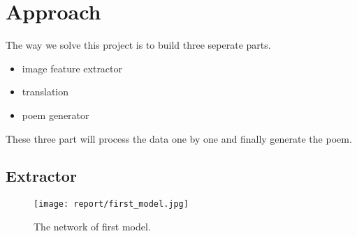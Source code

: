 \documentclass[10pt,twocolumn,letterpaper]{article}
\begin{document}

\section{Approach}
The way we solve this project is to build three seperate parts.
\begin{itemize}
\item image feature extractor
\item translation
\item poem generator
\end{itemize}

These three part will process the data one by one and finally generate the poem.

\subsection{Extractor}
\begin{figure*}
\begin{center}
\texttt{[image: report/first\_model.jpg]}
\end{center}
   \caption{The network of first model.}
\label{fig:first_layer_network}
\end{figure*}
\end{document}
